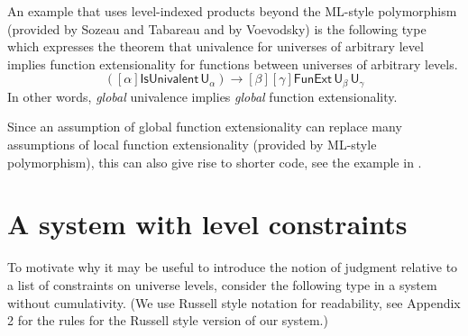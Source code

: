 \documentclass[11pt,a4paper]{article}
\theoremstyle{definition}
\newcommand{\NN}{\mathsf{N}}
\newcommand{\UU}{\mathsf{U}}
\begin{document}
An example that uses level-indexed products beyond the ML-style
polymorphism (provided by Sozeau and Tabareau and by Voevodsky)
is the following type which
expresses the theorem that univalence for universes of arbitrary level implies
function extensionality for functions between universes of arbitrary levels.
$$
([\alpha]\mathsf{IsUnivalent}\, \UU_\alpha)
\to [\beta][\gamma] \mathsf{FunExt}\, \UU_\beta\, \UU_\gamma
$$
In other words, {\em global} univalence  implies {\em global} function extensionality.

Since an assumption of global function extensionality can replace many assumptions of local function extensionality (provided by ML-style polymorphism), this can also give rise to shorter code, see the example in \cite{escardo:UFinAgda}.





\section{A system with level constraints}\label{sec:constraints}

To motivate why it may be useful to introduce the notion of judgment relative to a list of constraints on universe levels, consider the following type in a system without cumulativity. (We use Russell style notation for readability, see Appendix 2 for the rules for the Russell style version of our system.)
\end{document}
